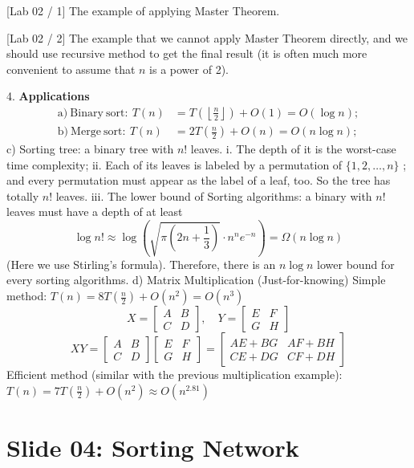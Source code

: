 \documentclass[10pt,a4paper]{article}
\begin{document}
[Lab 02 / 1] The example of applying Master Theorem.

[Lab 02 / 2] The example that we cannot apply Master Theorem directly, and we should use recursive method to get the final result (it is often much more convenient to assume that \(n\) is a power of 2).

4. \textbf{Applications}
\begin{align*}
\mathrm{a)~Binary~sort:~}T(n) &= T\left(\left\lfloor \frac{n}{2}\right\rfloor\right) + O(1) = O(\log n);\\
\mathrm{b)~Merge~sort:~}T(n) &= 2T\left(\frac{n}{2}\right) + O(n) = O(n\log n);
\end{align*}
c) Sorting tree: a binary tree with \(n!\) leaves.
    i. The depth of it is the worst-case time complexity;
    ii. Each of its leaves is labeled by a permutation of \(\{1,2,\dots,n\}\) ; and every permutation must appear as the label of a leaf, too. So the tree has totally \(n!\) leaves.
    iii. The lower bound of Sorting algorithms: a binary with \(n!\) leaves must have a depth of at least
    \[
    \log n! \approx \log \left(\sqrt{\pi\left(2n + \frac{1}{3}\right)}\cdot n^n e^{-n}\right) = \Omega (n\log n)
    \]
    (Here we use Stirling's formula). Therefore, there is an \(n\log n\) lower bound for every sorting algorithms.
d) Matrix Multiplication (Just-for-knowing)
Simple method: \(T(n) = 8T\left(\frac{n}{2}\right) + O(n^2) = O(n^3)\)
\[
X = \begin{bmatrix} A & B \\ C & D \end{bmatrix}, \quad Y = \begin{bmatrix} E & F \\ G & H \end{bmatrix}
\]
\[
XY = \begin{bmatrix} A & B \\ C & D \end{bmatrix} \begin{bmatrix} E & F \\ G & H \end{bmatrix} = \begin{bmatrix} AE + BG & AF + BH \\ CE + DG & CF + DH \end{bmatrix}
\]
Efficient method (similar with the previous multiplication example): \(T(n) = 7T\left(\frac{n}{2}\right) + O(n^2) \approx O(n^{2.81})\)

\section*{Slide 04: Sorting Network}
\end{document}
